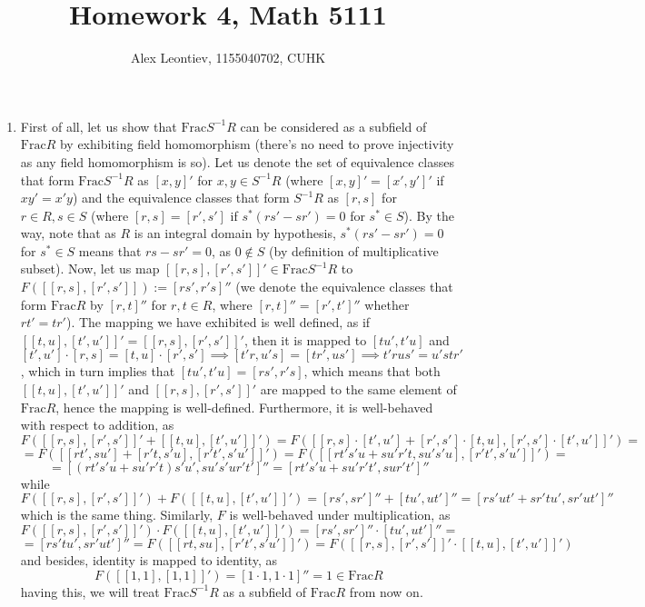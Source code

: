 \documentclass[8pt]{article} %
\title{Homework 4, Math 5111}
\author{Alex Leontiev, 1155040702, CUHK}
\begin{document}
\maketitle
\begin{enumerate}[label=\bfseries Problem \arabic*.]
	\newcommand{\Frac}{\mbox{Frac}}
	\item First of all, let us show that $\Frac S^{-1}R$ can be considered as a subfield of $\Frac R$ by exhibiting field homomorphism
		(there's no need to prove injectivity as any field homomorphism is so).
		Let us denote the set of equivalence classes that form $\Frac S^{-1}R$ as $[x,y]'$ for $x,y\in S^{-1}R$ (where $[x,y]'=[x',y']'$ if
		$xy'=x'y$) and the equivalence classes that form $S^{-1}R$ as $[r,s]$ for $r\in R,s\in S$ (where $[r,s]=[r',s']$ if $s^*(rs'-sr')=0$
		for $s^*\in S$). By the way, note that as $R$ is an integral domain by hypothesis, $s^*(rs'-sr')=0$ for $s^*\in S$ means that
		$rs-sr'=0$, as $0\notin S$ (by definition of multiplicative subset). Now, let us map $[[r,s],[r',s']]'\in\Frac S^{-1}R$ to $
		F([[r,s],[r',s']]):=[
		rs',r's]''$ (we denote the equivalence classes that form $\Frac R$ by $[r,t]''$ for $r,t\in R$, where $[r,t]''=[r',t']''$ whether
		$rt'=tr'$). The mapping we have exhibited is well defined, as if $[[t,u],[t',u']]'=[[r,s],[r',s']]'$, then it is
		mapped to $[tu',t'u]$ and
		\[[t',u']\cdot[r,s]=[t,u]\cdot[r',s']\implies [t'r,u's]=[tr',us']\implies t'rus'=u'str'\], which in turn implies that $[tu',t'u]=
		[rs',r's]$, which means that both $[[t,u],[t',u']]'$ and $[[r,s],[r',s']]'$ are mapped to the same element of $\Frac R$, hence
		the mapping is well-defined. Furthermore, it is well-behaved with respect to addition, as \[F([[r,s],[r',s']]'+[[t,u],[t',u']]')=
		F([[r,s]\cdot[t',u']+[r',s']\cdot[t,u],[r',s']\cdot[t',u']]')=\]
		\[=F([[rt',su']+[r't,s'u],[r't',s'u']]')=F([[rt's'u+su'r't,su's'u],[r't',s'u']]')=\]\[=[(rt's'u+su'r't)s'u',su's'ur't']''=
		[rt's'u+su'r't',sur't']''\]
		while \[F([[r,s],[r',s']]')+F([[t,u],[t',u']]')=[rs',sr']''+[tu',ut']''=[rs'ut'+sr'tu',sr'ut']''\]
		which is the same thing. Similarly, $F$ is well-behaved under multiplication, as
		\[F([[r,s],[r',s']]')\cdot F([[t,u],[t',u']]')=[rs',sr']''\cdot[tu',ut']''=\]
		\[=[rs'tu',sr'ut']''=F([[rt,su],[r't',s'u']]')=F([[r,s],[r',s']]'\cdot[[t,u],[t',u']]')\]
		and besides, identity is mapped to identity, as
		\[F([[1,1],[1,1]]')=[1\cdot1,1\cdot1]''=1\in\Frac R\]
		having this, we will treat $\Frac S^{-1}R$ as a subfield of $\Frac R$ from now on.


\end{enumerate}
\end{document}
